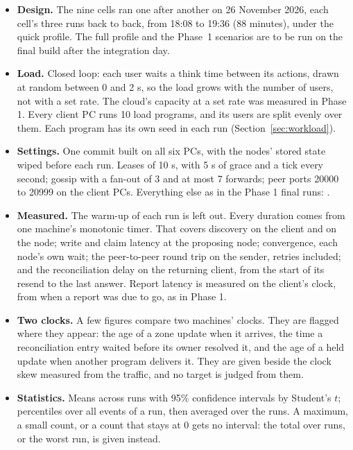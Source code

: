 \begin{itemize}
  \item \textbf{Design.} The nine cells ran one after another on 26 November 2026, each cell's three runs back to back, from 18:08 to 19:36 (88 minutes), under the quick profile. The full profile and the Phase~1 scenarios are to be run on the final build after the integration day.
  \item \textbf{Load.} Closed loop: each user waits a think time between its actions, drawn at random between 0 and 2 s, so the load grows with the number of users, not with a set rate. The cloud's capacity at a set rate was measured in Phase 1. Every client PC runs 10 load programs, and its users are split evenly over them. Each program has its own seed in each run (Section~\ref{sec:workload}).
  \item \textbf{Settings.} One commit built on all six PCs, with the nodes' stored state wiped before each run. Leases of 10 s, with 5 s of grace and a tick every second; gossip with a fan-out of 3 and at most 7 forwards; peer ports 20000 to 20999 on the client PCs. Everything else as in the Phase 1 final runs: \tbd{}.
  \item \textbf{Measured.} The warm-up of each run is left out. Every duration comes from one machine's monotonic timer. That covers discovery on the client and on the node; write and claim latency at the proposing node; convergence, each node's own wait; the peer-to-peer round trip on the sender, retries included; and the reconciliation delay on the returning client, from the start of its resend to the last answer. Report latency is measured on the client's clock, from when a report was due to go, as in Phase 1.
  \item \textbf{Two clocks.} A few figures compare two machines' clocks. They are flagged where they appear: the age of a zone update when it arrives, the time a reconciliation entry waited before its owner resolved it, and the age of a held update when another program delivers it. They are given beside the clock skew measured from the traffic, and no target is judged from them.
  \item \textbf{Statistics.} Means across runs with 95\% confidence intervals by Student's $t$; percentiles over all events of a run, then averaged over the runs. A maximum, a small count, or a count that stays at 0 gets no interval: the total over runs, or the worst run, is given instead.

\end{itemize}
